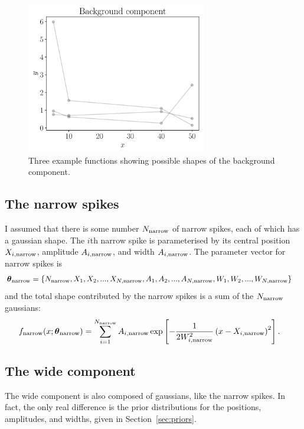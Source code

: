\documentclass[a4paper, 12pt]{article}
\newcommand{\params}{\boldsymbol{\theta}}
\newcommand{\x}{x}
\begin{document}
\begin{figure}
\centering
\includegraphics[width=0.7\textwidth]{figures/background.pdf}
\caption{Three example functions showing possible shapes of the
background component.\label{fig:background}}
\end{figure}

\subsection{The narrow spikes}
I assumed that there is some number $N_{\rm narrow}$ of narrow spikes,
each of which has a gaussian shape. The $i$th narrow spike is parameterised
by its central position $X_{i, \rm narrow}$,
amplitude $A_{i, \rm narrow}$, and width $A_{i, \rm narrow}$.
The parameter vector for narrow spikes is
\begin{align}
\params_{\rm narrow} &=
  \{N_{\rm narrow}, X_1, X_2, ..., X_{N, \rm narrow},
    A_1, A_2, ..., A_{N, \rm narrow},
    W_1, W_2, ..., W_{N, \rm narrow}\}
\end{align}
and the total shape contributed by the
narrow spikes is a sum of the $N_{\rm narrow}$ gaussians:
\begin{align}
f_{\rm narrow}(\x; \params_{\rm narrow}) &=
    \sum_{i=1}^{N_{\rm narrow}} A_{i, \rm narrow}
 \exp\left[-\frac{1}{2W_{i, \rm narrow}^2}\left(x - X_{i, \rm narrow}\right)^2\right].
\end{align}

\subsection{The wide component}
The wide component is also composed of gaussians, like the narrow spikes.
In fact, the only real difference is the prior distributions for the positions,
amplitudes, and widths, given in Section~\ref{sec:priors}.
\end{document}
